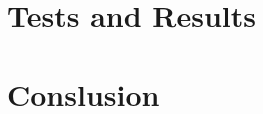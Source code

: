 \documentclass[10pt,twocolumn,letterpaper]{article}
\begin{document}
\section{Tests and Results} \label{sec:testes}

\section{Conslusion} \label{sec:conclusao}


{\small


}
\end{document}
